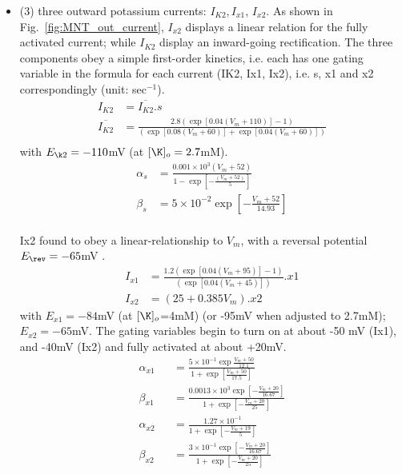 \begin{itemize}
\item (3) three outward potassium currents: $I_{K2}, I_{x1}$, $I_{x2}$. As shown
  in Fig.~\ref{fig:MNT_out_current}, $I_{x2}$ displays a linear
  relation for the fully activated current; while $I_{K2}$ display an
  inward-going rectification. 
  The three components obey a simple first-order kinetics, i.e. each has one
gating variable in the formula for each current (IK2, Ix1, Ix2), i.e. s, x1
and x2 correspondingly (unit: sec$^{-1}$).
    \begin{equation}
      \label{eq:699}
      \begin{split}
        I_{K2} &= \overline{I_{K2}}.s \\
        \overline{I_{K2}} &= \frac{ 2.8(\exp[0.04(V_m +110)]-1)}{(\exp[0.08(V_m + 60)]
          +\exp [0.04(V_m + 60)])} \\
      \end{split}
    \end{equation}
with $E_{\k2}=-110$mV (at $[\K]_o=2.7$mM). 
\begin{equation}
  \label{eq:613}
  \begin{split}
    \alpha_s &= \frac{0.001 \times 10^3 (V_m + 52)}{1-\exp[-\frac{(V_m +
    52)}{5}]}
    \\
    \beta_s &= 5\times 10^{-2} \exp[-\frac{V_m + 52}{14.93}]\\
  \end{split}
\end{equation}

Ix2 found to obey a linear-relationship to $V_m$, with a reversal potential
$E_\rev=-65$mV \citep{noble1969omc}. 
\begin{equation}
  \label{eq:612}
  \begin{split}
    I_{x1} &= \frac{1.2(\exp [0.04(V_m + 95)]-1 )}{(\exp [0.04(V_m +
      45)])} .x1 \\
    I_{x2} &= (25+0.385V_m).x2
  \end{split}
\end{equation}
with $E_{x1}=-84$mV (at $[\K]_o$=4mM) (or -95mV when adjusted to 2.7mM);
$E_{x2}=-65$mV. The gating variables begin to turn on at about -50 mV (Ix1), and
-40mV (Ix2) and fully activated at about +20mV. 
\begin{eqnarray}
    \alpha_{x1} &&= \frac{5\times
    10^{-1}\exp\frac{V_m+50}{12.1}}{1+\exp[\frac{V_m+50}{17.5}]} \\
    \beta_{x1} &&= \frac{0.0013\times 10^3
      \exp[-\frac{V_m+20}{16.67}]}{1+\exp[-\frac{V_m+20}{25}]} \\
    \alpha_{x2} &&= \frac{1.27\times 10^{-1}}{
      1+\exp[-\frac{V_m+19}{5}]} \\
    \beta_{x2} &&=  \frac{3\times 10^{-1}
      \exp[-\frac{V_m+20}{16.67}]}{1+\exp[-\frac{V_m+20}{25}]}
\end{eqnarray}


\end{itemize}
